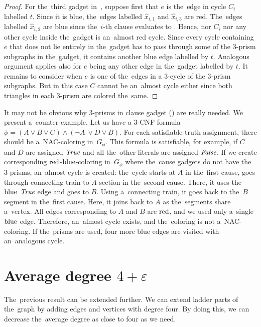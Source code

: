 \begin{proof}
	For the~third gadget in~,
	suppose first that $e$ is the~edge in cycle $C_i$ labelled $t$.
	Since it is blue, the~edges labelled $\hat{x}_{i,1}$ and $\hat{x}_{i,3}$ are red.
	The~edges labelled $\hat{x}_{i,2}$ are blue since the~$i$-th clause evaluates to \true{}.
	Hence, nor $C_i$ nor any other cycle inside the~gadget is an~almost red cycle.
	Since every cycle containing $e$ that does not lie entirely in the~gadget
	has to pass through some of the 3-prism subgraphs in the~gadget, it contains another blue edge labelled by $t$.
	Analogous argument applies also for $e$ being any other edge in the~gadget labelled by $t$.
	It remains to consider when $e$ is one of the~edges in a 3-cycle of the 3-prism subgraphs.
	But in this case $C$ cannot be an~almost cycle either since both triangles in each 3-prism are colored the~same.
\end{proof}

It may not be obvious why 3-prisms in clause gadget
()
are really needed. We present a~counter-example.
Let us have a 3-CNF formula~\( \phi = (A \lor B \lor C) \land (\lnot A~\lor D \lor B) \).
For each satisfiable truth assignment, there should be a~NAC-coloring in~\( G_\phi \).
%
This formula is satisfiable, for example, if \( C \) and \( D \) are assigned \( \textit{True} \)
and all the~other literals are assigned \( \textit{False} \).
If we create corresponding \( \text{red} \)-\( \text{blue} \)-coloring in~\( G_\phi \)
where the~cause gadgets do not have the 3-prisms, an~almost cycle is created:
%
the~cycle starts at \( A \) in the~first cause, goes through connecting
train to \( A \) section in the~second cause. There, it uses the~\( \text{blue} \)
\( \textit{True} \) edge and goes to \( B \). Using a~connecting train,
it goes back to the~\( B \) segment in the~first cause.
Here, it joins back to \( A \) as the~segments share a~vertex.
All edges corresponding to \( A \) and \( B \)
are \( \text{red} \), and we used only a~single \( \text{blue} \) edge.
Therefore, an~almost cycle exists, and the~coloring is not a~NAC-coloring.
If the~prisms are used, four more blue edges are visited with an~analogous cycle.


\section{Average degree \( 4 + \varepsilon \)}

The~previous result can be extended further.
We can extend ladder parts of the~graph by adding
edges and vertices with degree four.
By doing this, we can decrease the~average degree as close to four as we need.

